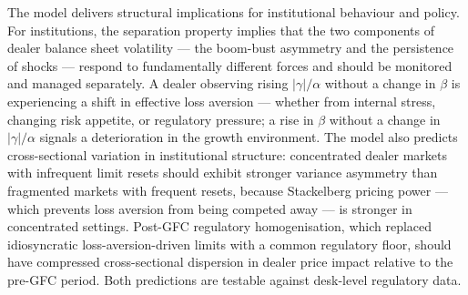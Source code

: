 \documentclass[12pt,a4paper]{article}
\theoremstyle{definition}
\begin{document}
The model delivers structural implications for institutional behaviour
and policy. For institutions, the separation property implies that the
two components of dealer balance sheet volatility --- the boom-bust
asymmetry and the persistence of shocks --- respond to fundamentally
different forces and should be monitored and managed separately. A
dealer observing rising $|\gamma|/\alpha$ without a change in $\beta$ is
experiencing a shift in effective loss aversion --- whether from internal
stress, changing risk appetite, or regulatory pressure; a rise in
$\beta$ without a change in $|\gamma|/\alpha$ signals a deterioration in
the growth environment. The model also predicts cross-sectional
variation in institutional structure: concentrated dealer markets with
infrequent limit resets should exhibit stronger variance asymmetry than
fragmented markets with frequent resets, because Stackelberg pricing
power --- which prevents loss aversion from being competed away --- is
stronger in concentrated settings. Post-GFC regulatory homogenisation,
which replaced idiosyncratic loss-aversion-driven limits with a common
regulatory floor, should have compressed cross-sectional dispersion in
dealer price impact relative to the pre-GFC period. Both predictions
are testable against desk-level regulatory data.
\end{document}
